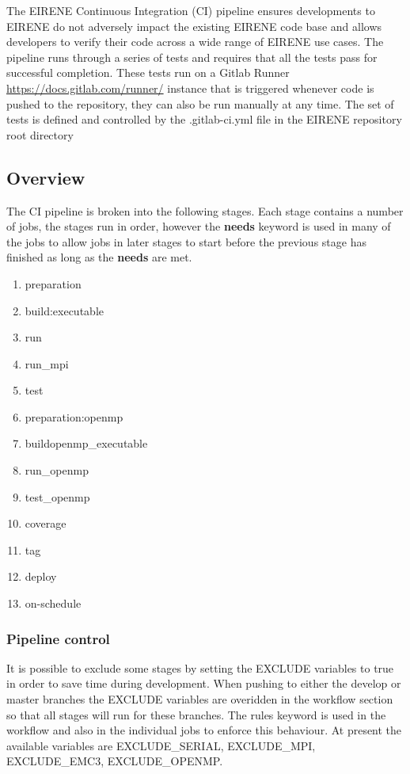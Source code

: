 The EIRENE Continuous Integration (CI) pipeline ensures developments to EIRENE do not adversely impact the existing EIRENE code base and allows developers to verify their code across a wide range of EIRENE use cases. The pipeline runs through a series of tests and requires that all the tests pass for successful completion. These tests run on a Gitlab Runner \url{https://docs.gitlab.com/runner/} instance that is triggered whenever code is pushed to the repository, they can also be run manually at any time. The set of tests is defined and controlled by the {.gitlab-ci.yml} file in the EIRENE repository root directory


\subsection{Overview}
The CI pipeline is broken into the following stages. Each stage contains a number of jobs, the stages run in order, however the \textbf{needs} keyword is used in many of the jobs to allow jobs in later stages to start before the previous stage has finished as long as the \textbf{needs} are met.

\begin{enumerate}
\item preparation
\item build:executable
\item run
\item run\_mpi
\item test
\item preparation:openmp
\item build\:openmp\_executable
\item run\_openmp
\item test\_openmp
\item coverage
\item tag
\item deploy
\item on-schedule
\end{enumerate}

\subsubsection{Pipeline control}
It is possible to exclude some stages by setting the {EXCLUDE} variables to {true} in order to save time during development. When pushing to either the {develop} or {master} branches the {EXCLUDE} variables are overidden in the {workflow} section so that all stages will run for these branches. The {rules} keyword is used in the {workflow} and also  in the individual jobs to enforce this behaviour. At present the available variables are {EXCLUDE\_SERIAL}, {EXCLUDE\_MPI}, {EXCLUDE\_EMC3}, {EXCLUDE\_OPENMP}.

